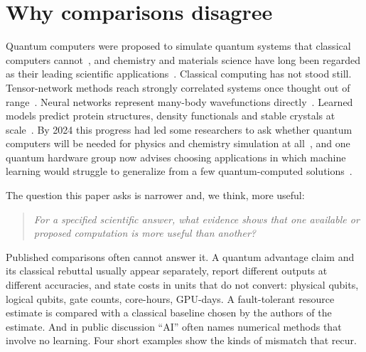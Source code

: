 \section{Why comparisons disagree}
\label{sec:intro}

Quantum computers were proposed to simulate quantum systems that classical computers cannot~\cite{feynman1982,lloyd1996}, and chemistry and materials science have long been regarded as their leading scientific applications~\cite{aspuru2005,reiher2017,bauer2020}. Classical computing has not stood still. Tensor-network methods reach strongly correlated systems once thought out of range~\cite{white1992,chan2011}. Neural networks represent many-body wavefunctions directly~\cite{carleo2017,carleo2019}. Learned models predict protein structures, density functionals and stable crystals at scale~\cite{jumper2021,luise2025,merchant2023}. By 2024 this progress had led some researchers to ask whether quantum computers will be needed for physics and chemistry simulation at all~\cite{gent2024}, and one quantum hardware group now advises choosing applications in which machine learning would struggle to generalize from a few quantum-computed solutions~\cite{babbush2025}.

The question this paper asks is narrower and, we think, more useful:
\begin{quote}
\emph{For a specified scientific answer, what evidence shows that one available or proposed computation is more useful than another?}
\end{quote}
Published comparisons often cannot answer it. A quantum advantage claim and its classical rebuttal usually appear separately, report different outputs at different accuracies, and state costs in units that do not convert: physical qubits, logical qubits, gate counts, core-hours, GPU-days. A fault-tolerant resource estimate is compared with a classical baseline chosen by the authors of the estimate. And in public discussion ``AI'' often names numerical methods that involve no learning. Four short examples show the kinds of mismatch that recur.

